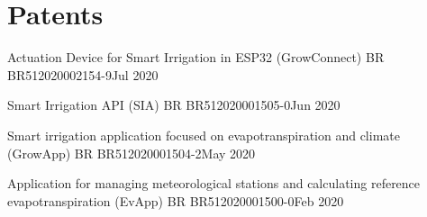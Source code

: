 \section{Patents}
    \resumeSubHeadingListStart

    \resumePubliSubheading
    {Actuation Device for Smart Irrigation in ESP32 (GrowConnect)}
    {BR BR512020002154-9}{Jul 2020}

    \resumePubliSubheading
    {Smart Irrigation API (SIA)}
    {BR BR512020001505-0}{Jun 2020}

    \resumePubliSubheading
    {Smart irrigation application focused on evapotranspiration and climate (GrowApp)}
    {BR BR512020001504-2}{May 2020}

    \resumePubliSubheading
    {Application for managing meteorological stations and calculating reference evapotranspiration (EvApp)}
    {BR BR512020001500-0}{Feb 2020}

    \resumeSubHeadingListEnd